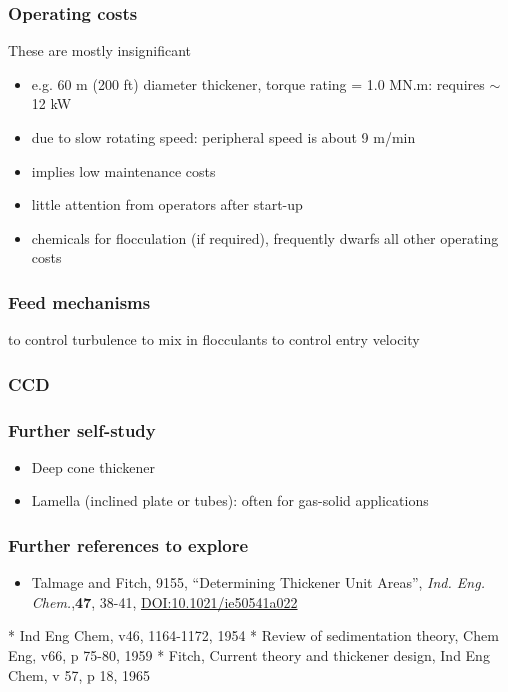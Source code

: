 \begin{frame}\frametitle{Operating costs}
	These are mostly insignificant
	\begin{itemize}
		\item	e.g. 60 m (200 ft) diameter thickener, torque rating = 1.0 MN.m: requires $\sim$ 12 kW
		\item	due to slow rotating speed: peripheral speed is about 9 m/min 
		\item	implies low maintenance costs
		\item	little attention from operators after start-up
		\item	chemicals for flocculation (if required), frequently dwarfs all other operating costs 
	\end{itemize}
\end{frame}

\begin{frame}\frametitle{Feed mechanisms}
	to control turbulence
	to mix in flocculants
	to control entry velocity
\end{frame}

\begin{frame}\frametitle{CCD}
	
\end{frame}

\begin{frame}\frametitle{Further self-study}
	\begin{itemize}
		\item	Deep cone thickener
		\item	Lamella (inclined plate or tubes): often for gas-solid applications 
				\vspace{12pt}
	\end{itemize}
\end{frame}

\begin{frame}\frametitle{Further references to explore}	
	\begin{itemize}
		\item	Talmage and Fitch, 9155, ``Determining Thickener Unit Areas'', \emph{Ind. Eng. Chem.},\textbf{47}, 38-41, \href{http://dx.doi.org/10.1021/ie50541a022}{\small DOI:10.1021/ie50541a022}
	\end{itemize}
	* Ind Eng Chem, v46, 1164-1172, 1954
	* Review of sedimentation theory, Chem Eng, v66, p 75-80, 1959
	* Fitch, Current theory and thickener design, Ind Eng Chem, v 57, p 18, 1965	
\end{frame}

